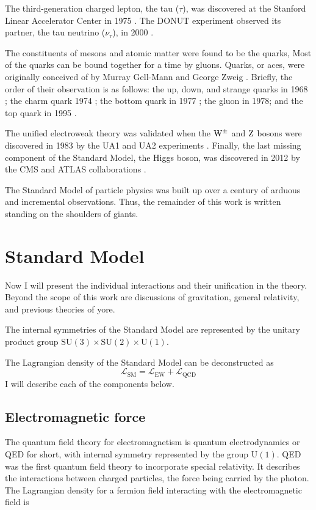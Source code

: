 The third-generation charged lepton, the tau ($\tau$), was discovered at the Stanford Linear Accelerator Center in 1975 \cite{Perl1975}.
The DONUT experiment observed its partner, the tau neutrino ($\nu_\tau$), in 2000 \cite{Donut2001}.

The constituents of mesons and atomic matter were found to be the quarks, 
Most of the quarks can be bound together for a time by gluons. 
Quarks, or aces, were originally conceived of by Murray Gell-Mann \cite{GellMann:1964nj} and George Zweig \cite{Zweig:570209}.
Briefly, the order of their observation is as follows: 
the up, down, and strange quarks in 1968 \cite{PhysRevLett.23.930} \cite{PhysRevLett.23.935};
the charm quark 1974 \cite{Ting1974} \cite{Richter1974};
the bottom quark in 1977 \cite{Lederman1977};
the gluon in 1978; \cite{Stella2011}
and the top quark in 1995 \cite{CDFTop1995} \cite{D0Top1995}.

The unified electroweak theory was validated when the $\mathrm{W}^\pm$ and $\mathrm{Z}$ bosons 
were discovered in 1983 by the UA1 and UA2 experiments 
\cite{Arnison:1983mk} \cite{Arnison:1983rp} \cite{Bagnaia:1983zx} \cite{Banner:1983jy}. 
Finally, the last missing component of the Standard Model, the Higgs boson, was discovered in 2012 by the CMS and ATLAS collaborations \cite{Chatrchyan:2012xdj} \cite{Aad:2012tfa}.

The Standard Model of particle physics was built up over a century of arduous and incremental observations. Thus, the remainder of this work is written standing on the shoulders of giants.

\section{Standard Model}
Now I will present the individual interactions and their unification in the theory.
Beyond the scope of this work are discussions of gravitation, general relativity, and
previous theories of yore.

The internal symmetries of the Standard Model are represented by the unitary product group 
$\mathrm{SU}(3) \times \mathrm{SU}(2) \times \mathrm{U}(1)$.

The Lagrangian density of the Standard Model can be deconstructed as
\begin{equation}
\mathcal{L}_\mathrm{SM} = \mathcal{L}_\mathrm{EW} + \mathcal{L}_\mathrm{QCD}
\end{equation}
I will describe each of the components below.

\subsection{Electromagnetic force}
\label{qed}
The quantum field theory for electromagnetism is quantum electrodynamics or QED for short,
with internal symmetry represented by the group $\mathrm{U}(1)$. 
QED was the first quantum field theory to incorporate special relativity. 
It describes the interactions between charged particles, the force being carried by the photon.
The Lagrangian density for a fermion field interacting with the electromagnetic field is

